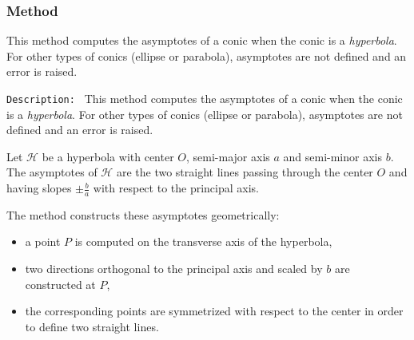 \vspace{1em}


\begin{minipage}{.3\textwidth}
\end{minipage}
\begin{minipage}{.7\textwidth}
\begin{tkzexample}
\end{tkzexample}
\end{minipage}



\subsubsection{Method }
\label{ssub:conic_asymptotes}

This method computes the asymptotes of a conic when the conic is a
\emph{hyperbola}.
For other types of conics (ellipse or parabola), asymptotes are not defined
and an error is raised.

\medskip

\texttt{Description: }
This method computes the asymptotes of a conic when the conic is a
\emph{hyperbola}.
For other types of conics (ellipse or parabola), asymptotes are not defined
and an error is raised.

\medskip

Let $\mathcal{H}$ be a hyperbola with center $O$, semi-major axis $a$ and
semi-minor axis $b$.
The asymptotes of $\mathcal{H}$ are the two straight lines passing through the
center $O$ and having slopes $\pm \tfrac{b}{a}$ with respect to the principal
axis.

The method constructs these asymptotes geometrically:
\begin{itemize}
  \item a point $P$ is computed on the transverse axis of the hyperbola,
  \item two directions orthogonal to the principal axis and scaled by $b$
        are constructed at $P$,
  \item the corresponding points are symmetrized with respect to the center
        in order to define two straight lines.
\end{itemize}

